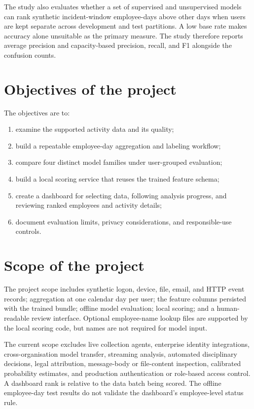\documentclass[12pt,a4paper,oneside]{report}
\begin{document}
The study also evaluates whether a set of supervised and unsupervised
models can rank synthetic incident-window employee-days above other
days when users are kept separate across development and test
partitions. A low base rate makes accuracy alone unsuitable as the
primary measure. The study therefore reports average precision and
capacity-based precision, recall, and F1 alongside the confusion
counts.

\section{Objectives of the project}
The objectives are to:
\begin{enumerate}
  \item examine the supported activity data and its quality;
  \item build a repeatable employee-day aggregation and labeling
  workflow;
  \item compare four distinct model families under user-grouped
  evaluation;
  \item build a local scoring service that reuses the trained feature
  schema;
  \item create a dashboard for selecting data, following analysis
  progress, and reviewing ranked employees and activity details;
  \item document evaluation limits, privacy considerations, and
  responsible-use controls.
\end{enumerate}

\section{Scope of the project}
The project scope includes synthetic logon, device, file, email, and
HTTP event records; aggregation at one calendar day per user; the
feature columns persisted with the trained bundle; offline model
evaluation; local scoring; and a human-readable review interface.
Optional employee-name lookup files are supported by the local scoring
code, but names are not required for model input.

The current scope excludes live collection agents, enterprise identity
integrations, cross-organisation model transfer, streaming analysis,
automated disciplinary decisions, legal attribution, message-body or
file-content inspection, calibrated probability estimates, and
production authentication or role-based access control. A dashboard
rank is relative to the data batch being scored. The offline
employee-day test results do not validate the dashboard's
employee-level status rule.
\end{document}
